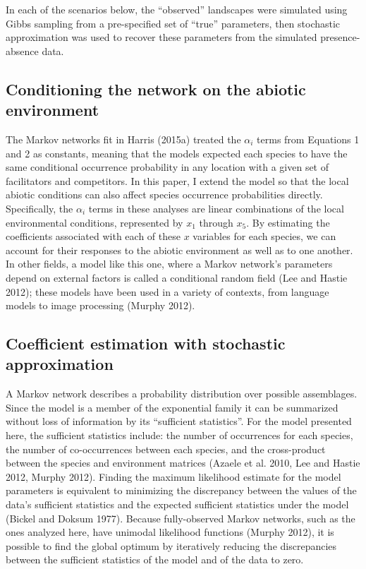 \documentclass[12pt,]{article}
\begin{document}
\begin{spacing}{1.9}
\begin{flushleft}
In each of the scenarios below, the ``observed'' landscapes were
simulated using Gibbs sampling from a pre-specified set of ``true''
parameters, then stochastic approximation was used to recover these
parameters from the simulated presence-absence data.

\subsection{Conditioning the network on the abiotic
environment}\label{conditioning-the-network-on-the-abiotic-environment}

The Markov networks fit in Harris (2015a) treated the \(\alpha_i\) terms
from Equations 1 and 2 as constants, meaning that the models expected
each species to have the same conditional occurrence probability in any
location with a given set of facilitators and competitors. In this
paper, I extend the model so that the local abiotic conditions can also
affect species occurrence probabilities directly. Specifically, the
\(\alpha_i\) terms in these analyses are linear combinations of the
local environmental conditions, represented by \(x_1\) through \(x_5\).
By estimating the coefficients associated with each of these \(x\)
variables for each species, we can account for their responses to the
abiotic environment as well as to one another. In other fields, a model
like this one, where a Markov network's parameters depend on external
factors is called a conditional random field (Lee and Hastie 2012);
these models have been used in a variety of contexts, from language
models to image processing (Murphy 2012).

\subsection{Coefficient estimation with stochastic
approximation}\label{coefficient-estimation-with-stochastic-approximation}

A Markov network describes a probability distribution over possible
assemblages. Since the model is a member of the exponential family it
can be summarized without loss of information by its ``sufficient
statistics''. For the model presented here, the sufficient statistics
include: the number of occurrences for each species, the number of
co-occurrences between each species, and the cross-product between the
species and environment matrices (Azaele et al. 2010, Lee and Hastie
2012, Murphy 2012). Finding the maximum likelihood estimate for the
model parameters is equivalent to minimizing the discrepancy between the
values of the data's sufficient statistics and the expected sufficient
statistics under the model (Bickel and Doksum 1977). Because
fully-observed Markov networks, such as the ones analyzed here, have
unimodal likelihood functions (Murphy 2012), it is possible to find the
global optimum by iteratively reducing the discrepancies between the
sufficient statistics of the model and of the data to zero.


\end{flushleft}
\end{spacing}
\end{document}
